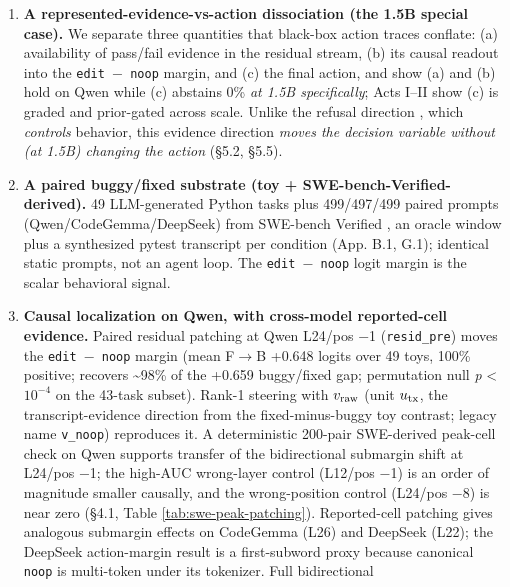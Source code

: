 \documentclass[
  11pt,
  a4paper]{article}
\providecommand{\tightlist}{%
  \setlength{\itemsep}{0pt}\setlength{\parskip}{0pt}}
\begin{document}
\begin{enumerate}
\def\labelenumi{\arabic{enumi}.}
\tightlist
\item
  \textbf{A represented-evidence-vs-action dissociation (the 1.5B
  special case).} We separate three quantities that black-box action
  traces conflate: (a) availability of pass/fail evidence in the
  residual stream, (b) its causal readout into the
  \texttt{edit\ \ensuremath{-}\ noop} margin, and (c) the final action, and show (a)
  and (b) hold on Qwen while (c) abstains 0\% \emph{at 1.5B
  specifically}; Acts I--II show (c) is graded and prior-gated across
  scale. Unlike the refusal direction \citep{arditi2024refusal}, which
  \emph{controls} behavior, this evidence direction \emph{moves the
  decision variable without (at 1.5B) changing the action} (\S{}5.2, \S{}5.5).
\item
  \textbf{A paired buggy/fixed substrate (toy +
  SWE-bench-Verified-derived).} 49 LLM-generated Python tasks plus
  499/497/499 paired prompts (Qwen/CodeGemma/DeepSeek) from SWE-bench
  Verified \citep{jimenez2024swebench}, an oracle window plus a
  synthesized pytest transcript per condition (App. B.1, G.1); identical
  static prompts, not an agent loop. The \texttt{edit\ \ensuremath{-}\ noop} logit
  margin is the scalar behavioral signal.
\item
  \textbf{Causal localization on Qwen, with cross-model reported-cell
  evidence.} Paired residual patching at Qwen L24/pos \ensuremath{-}1
  (\texttt{resid\_pre}) moves the \texttt{edit\ \ensuremath{-}\ noop} margin (mean
  F\ensuremath{\rightarrow}B +0.648 logits over 49 toys, 100\% positive; recovers
  \textasciitilde98\% of the +0.659 buggy/fixed gap; permutation null
  \emph{p} \textless{} \(10^{-4}\) on the 43-task subset). Rank-1
  steering with \(v_{\rm raw}\) (unit \(u_{\rm tx}\), the
  transcript-evidence direction from the fixed-minus-buggy toy contrast;
  legacy name \texttt{v\_noop}) reproduces it. A deterministic 200-pair
  SWE-derived peak-cell check on Qwen supports transfer of the
  bidirectional submargin shift at L24/pos \ensuremath{-}1; the high-AUC wrong-layer
  control (L12/pos \ensuremath{-}1) is an order of magnitude smaller causally, and
  the wrong-position control (L24/pos \ensuremath{-}8) is near zero (\S{}4.1, Table
  \ref{tab:swe-peak-patching}). Reported-cell patching gives analogous
  submargin effects on CodeGemma (L26) and DeepSeek (L22); the DeepSeek
  action-margin result is a first-subword proxy because canonical
  \texttt{noop} is multi-token under its tokenizer. Full bidirectional

\end{enumerate}
\end{document}
